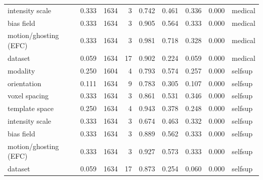 \begin{tabular}{lrrrrrrrl}
intensity scale & 0.333 & 1634 & 3 & 0.742 & 0.461 & 0.336 & 0.000 & medical \\
bias field & 0.333 & 1634 & 3 & 0.905 & 0.564 & 0.333 & 0.000 & medical \\
motion/ghosting (EFC) & 0.333 & 1634 & 3 & 0.981 & 0.718 & 0.328 & 0.000 & medical \\
dataset & 0.059 & 1634 & 17 & 0.902 & 0.224 & 0.059 & 0.000 & medical \\
modality & 0.250 & 1604 & 4 & 0.793 & 0.574 & 0.257 & 0.000 & selfsup \\
orientation & 0.111 & 1634 & 9 & 0.783 & 0.305 & 0.107 & 0.000 & selfsup \\
voxel spacing & 0.333 & 1634 & 3 & 0.861 & 0.531 & 0.346 & 0.000 & selfsup \\
template space & 0.250 & 1634 & 4 & 0.943 & 0.378 & 0.248 & 0.000 & selfsup \\
intensity scale & 0.333 & 1634 & 3 & 0.674 & 0.463 & 0.332 & 0.000 & selfsup \\
bias field & 0.333 & 1634 & 3 & 0.889 & 0.562 & 0.333 & 0.000 & selfsup \\
motion/ghosting (EFC) & 0.333 & 1634 & 3 & 0.927 & 0.573 & 0.333 & 0.000 & selfsup \\
dataset & 0.059 & 1634 & 17 & 0.873 & 0.254 & 0.060 & 0.000 & selfsup \\
\bottomrule
\end{tabular}
